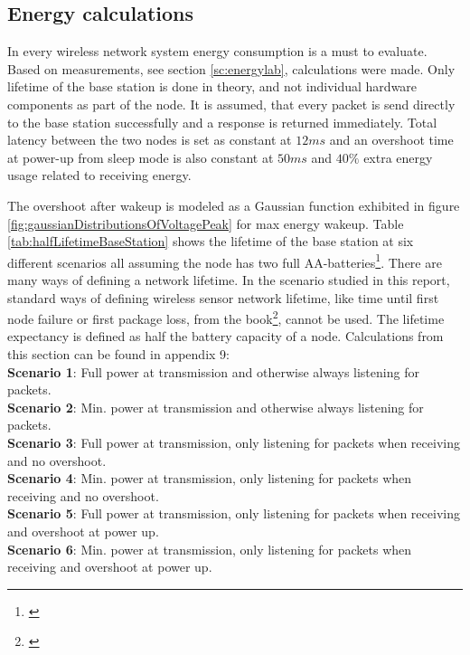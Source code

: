 \subsection{Energy calculations}\label{sc:energyCalculations}

In every wireless network system energy consumption is a must to evaluate. Based on measurements, see section \ref{sc:energylab}, calculations were made. Only lifetime of the base station is done in theory, and not individual hardware components as part of the node. It is assumed, that every packet is send directly to the base station successfully and a response is returned immediately. Total latency between the two nodes is set as constant at $12 ms$ and an overshoot time at power-up from sleep mode is also constant at $50 ms$ and $40\%$ extra energy usage related to receiving energy.

\noindent The overshoot after wakeup is modeled as a Gaussian function exhibited in figure \ref{fig:gaussianDistributionsOfVoltagePeak} for max energy wakeup. Table \ref{tab:halfLifetimeBaseStation} shows the lifetime of the base station at six different scenarios all assuming the node has two full AA-batteries\footnote{\cite{Wikipedia20180528at1231}}. There are many ways of defining a network lifetime. In the scenario studied in this report, standard ways of defining wireless sensor network lifetime, like time until first node failure or first package loss, from the book\footnote{\cite[p.~65]{Karl2006}}, cannot be used. The lifetime expectancy is defined as half the battery capacity of a node. Calculations from this section can be found in appendix 9: \\

\noindent \textbf{Scenario 1}: Full power at transmission and otherwise always listening for packets.\\
\textbf{Scenario 2}: Min. power at transmission and otherwise always listening for packets.\\
\textbf{Scenario 3}: Full power at transmission, only listening for packets when receiving and no overshoot.\\
\textbf{Scenario 4}: Min. power at transmission, only listening for packets when receiving and no overshoot.\\
\textbf{Scenario 5}: Full power at transmission, only listening for packets when receiving and overshoot at power up.\\
\textbf{Scenario 6}: Min. power at transmission, only listening for packets when receiving and overshoot at power up.\\

